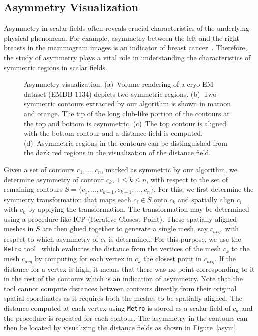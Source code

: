 \documentclass[review,journal]{vgtc}         %
\begin{document}
\subsection{Asymmetry Visualization}
Asymmetry in scalar fields often reveals crucial characteristics of the underlying
physical phenomena. For example, asymmetry between 
the left and the right breasts in the mammogram images is an indicator of breast 
cancer~\cite{tahmoush2007improved}. Therefore, the study of asymmetry plays a vital role 
in understanding the characteristics of symmetric regions in scalar fields. 
\begin{figure*}[t]
	\centering
	\caption{Asymmetry visualization. (a)~Volume rendering of a cryo-EM dataset (EMDB-1134) 
	depicts two symmetric regions. (b)~Two symmetric contours extracted by our algorithm is shown
in maroon and orange. The tip of the long club-like portion of the contours at the top and bottom is asymmetric.
(c)~The top contour is aligned with the bottom contour and a distance field is computed. (d)~Asymmetric regions
in the contours can be distinguished from the dark red regions in the visualization of the distance field.}
\end{figure*}

Given a set of contours $c_1,\dots,c_n$, marked as symmetric
by our algorithm, we determine asymmetry of contour $c_k$, $1 \leq k \leq n$, with
respect to the set of remaining contours $S = \{c_1, \dots, c_{k-1}, c_{k+1}, \dots, c_n\}$.
For this, we first determine the symmetry transformation that maps each $c_i \in S$ onto
$c_k$ and spatially align $c_i$ with $c_k$ by applying the transformation. 
The transformation may be determined using a procedure like ICP (Iterative Closest Point).
These spatially aligned meshes in $S$ are then glued together to generate a single mesh, say $c_{avg}$, 
with respect to which asymmetry of $c_k$ is determined. For this purpose, we use the 
\texttt{Metro} tool~\cite{CigRS98} which evaluates the distance from the vertices of the mesh 
$c_k$ to the mesh $c_{avg}$ by computing for each vertex in $c_k$ the closest point in $c_{avg}$. 
If the distance for a vertex is high, it means that there
was no point corresponding to it in the rest of the contours which is an indication of asymmetry.
Note that the tool cannot compute distances between contours directly from their original
spatial coordinates as it requires both the meshes to be spatially aligned. 
The distance computed at each vertex using \texttt{Metro} is stored as a scalar field of 
$c_k$ and the procedure is repeated
for each contour. The asymmetry in the contours can then be located by visualizing the distance fields
as shown in Figure~\ref{asym}.
\end{document}

